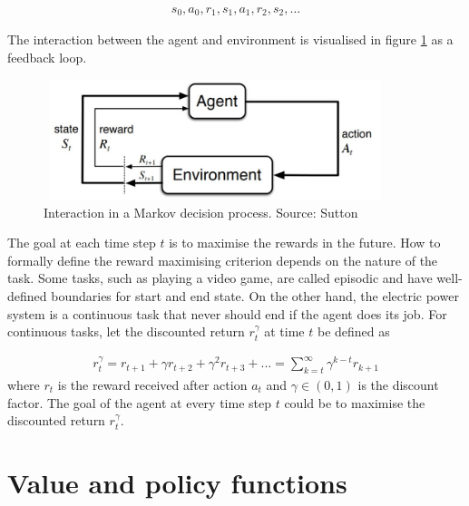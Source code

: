 \documentclass[class=book, crop=false]{standalone}
\begin{document}
\begin{equation}
   \begin{aligned}\label{eq:theory:trajectory}
s_{0},a_{0},r_{1},s_{1}, a_{1},r_{2},s_{2},...
\end{aligned} 
\end{equation}

The interaction between the agent and environment is visualised in figure \ref{fig:theory:markov_decision_process} as a feedback loop.

\begin{figure}[ht!]
    \center
    \includegraphics[height=3.5cm, width=10cm]{figures/markov_decision_processs.JPG}
    \caption[size = 9]{Interaction in a Markov decision process. Source: Sutton \cite{Sutton1998}}
    \label{fig:theory:markov_decision_process}
\end{figure}



The goal at each time step $t$ is to maximise the rewards in the future. How to formally define the reward maximising criterion depends on the nature of the task. Some tasks, such as playing a video game, are called episodic and have well-defined boundaries for start and end state. On the other hand, the electric power system is a continuous task that never should end if the agent does its job. For continuous tasks, let the discounted return $r^{\gamma}_{t}$ at time $t$ be defined as 


\begin{equation}
   \begin{aligned}\label{eq:theory:discounted_reward}
r^{\gamma}_{t} = r_{t+1} + \gamma r_{t+2} + \gamma^{2} r_{t+3} + ...
= \sum_{k=t}^{\infty} \gamma^{k-t}r_{k+1}
\end{aligned} 
\end{equation}
where $r_{t}$ is the reward received after action $a_{t}$ and $\gamma \in (0,1)$ is the discount factor. The goal of the agent at every time step $t$ could be to maximise the discounted return $r^{\gamma}_{t}$.



\section{Value and policy functions}
\end{document}
